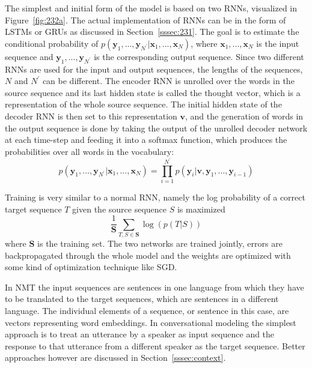 \documentclass[12pt]{article}
\begin{document}
The simplest and initial form of the model is based on two RNNs, visualized in Figure~\ref{fig:232a}. The actual implementation of RNNs can be in the form of LSTMs or GRUs as discussed in Section~\ref{sssec:231}. The goal is to estimate the conditional probability of \(p(\bm{y}_1,...,\bm{y}_{N^{'}}|\bm{x}_1,...,\bm{x}_N)\), where \(\bm{x}_1,...,\bm{x}_N\) is the input sequence and \(\bm{y}_1,...,\bm{y}_{N^{'}}\) is the corresponding output sequence. Since two different RNNs are used for the input and output sequences, the lengths of the sequences, \(N\) and \(N^{'}\) can be different. The encoder RNN is unrolled over the words in the source sequence and its last hidden state is called the thought vector, which is a representation of the whole source sequence. The initial hidden state of the decoder RNN is then set to this representation \(\bm{v}\), and the generation of words in the output sequence is done by taking the output of the unrolled decoder network at each time-step and feeding it into a softmax function, which produces the probabilities over all words in the vocabulary:
\begin{equation} \label{eq232a}
p(\bm{y}_1,...,\bm{y}_{N^{'}}|\bm{x}_1,...,\bm{x}_N)=\prod_{i=1}^{N^{'}}p(\bm{y}_i|\bm{v},\bm{y}_1,...,\bm{y}_{i-1})
\end{equation}

Training is very similar to a normal RNN, namely the log probability of a correct target sequence \(T\) given the source sequence \(S\) is maximized
\begin{equation} \label{eq232b}
\frac{1}{\bm{S}}\sum_{T,S \in \bm{S}}\log(p(T|S))
\end{equation}
where \(\bm{S}\) is the training set. The two networks are trained jointly, errors are backpropagated through the whole model and the weights are optimized with some kind of optimization technique like SGD.

In NMT the input sequences are sentences in one language from which they have to be translated to the target sequences, which are sentences in a different language. The individual elements of a sequence, or sentence in this case, are vectors representing word embeddings. In conversational modeling the simplest approach is to treat an utterance by a speaker as input sequence and the response to that utterance from a different speaker as the target sequence. Better approaches however are discussed in Section~\ref{sssec:context}.
\end{document}
